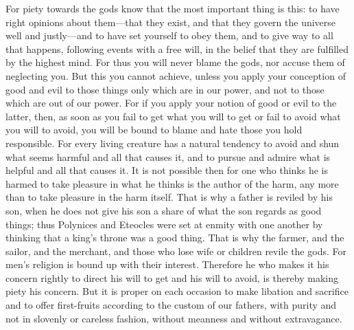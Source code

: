 For piety towards the gods know that  the most important thing is this: to have
right opinions about them---that they exist,  and that they govern the universe
well and justly---and to have set yourself to obey them, and to give way to all
that happens, following  events with a free  will, in the belief  that they are
fulfilled by  the highest  mind. For thus  you will never  blame the  gods, nor
accuse them  of neglecting you. But  this you cannot achieve,  unless you apply
your conception of good  and evil to those things only which  are in our power,
and not to  those which are out of  our power. For if you apply  your notion of
good or evil to the  latter, then, as soon as you fail to  get what you will to
get or  fail to avoid what  you will to avoid,  you will be bound  to blame and
hate  those you  hold  responsible. For  every living  creature  has a  natural
tendency to avoid  and shun what seems  harmful and all that causes  it, and to
pursue and admire  what is helpful and  all that causes it. It  is not possible
then for one who thinks he is harmed  to take pleasure in what he thinks is the
author of the harm, any more than to  take pleasure in the harm itself. That is
why a father  is reviled by his son, when  he does not give his son  a share of
what the son  regards as good things;  thus Polynices and Eteocles  were set at
enmity with one another by thinking that a king's throne was a good thing. That
is why the farmer, and the sailor, and the merchant, and those who lose wife or
children revile the  gods. For men's religion is bound  up with their interest.
Therefore he who makes it his concern rightly to direct his will to get and his
will to avoid,  is thereby making piety  his concern. But it is  proper on each
occasion to make libation and sacrifice  and to offer first-fruits according to
the custom of our fathers, with purity and not in slovenly or careless fashion,
without meanness and without extravagance.
